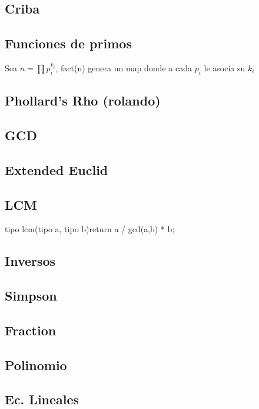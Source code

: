 \subsection{Criba}
\subsection{Funciones de primos}
Sea $n=\prod{p_i^{k_i}}$, fact(n) genera un map donde a cada $p_i$ le asocia su $k_i$
\subsection{Phollard's Rho (rolando)}
\subsection{GCD}
\subsection{Extended Euclid}
\subsection{LCM}
\begin{code}
tipo lcm(tipo a, tipo b){return a / gcd(a,b) * b;}
\end{code}
\subsection{Inversos}
\subsection{Simpson}
\subsection{Fraction}
\subsection{Polinomio}
\subsection{Ec. Lineales}

